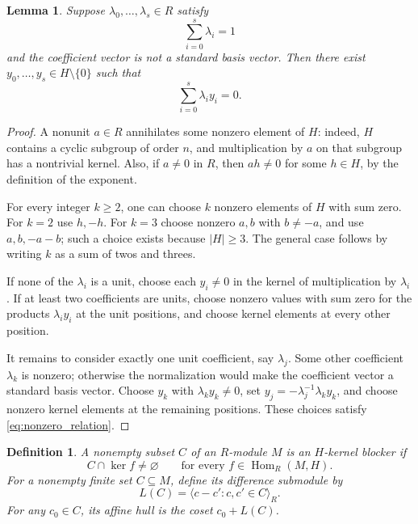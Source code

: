 \documentclass[10pt,a4paper]{amsart}
\newtheorem{lemma}[theorem]{Lemma}
\newtheorem{definition}[theorem]{Definition}
\numberwithin{equation}{section}
\newcommand{\Hom}{\operatorname{Hom}}
\renewcommand{\geq}{\geqslant}
\begin{document}
\begin{lemma}\label{lem:nonzero}
Suppose $\lambda_0,\ldots,\lambda_s\in R$ satisfy
\[
 \sum_{i=0}^{s}\lambda_i=1
\]
and the coefficient vector is not a standard basis vector. Then there exist $y_0,\ldots,y_s\in H\setminus\{0\}$ such that
\begin{equation}\label{eq:nonzero_relation}
 \sum_{i=0}^{s}\lambda_i y_i=0.
\end{equation}
\end{lemma}
\begin{proof}
A nonunit $a\in R$ annihilates some nonzero element of $H$: indeed, $H$ contains a cyclic subgroup of order $n$, and multiplication by $a$ on that subgroup has a nontrivial kernel. Also, if $a\ne 0$ in $R$, then $ah\ne 0$ for some $h\in H$, by the definition of the exponent.

For every integer $k\geq 2$, one can choose $k$ nonzero elements of $H$ with sum zero. For $k=2$ use $h,-h$. For $k=3$ choose nonzero $a,b$ with $b\ne-a$, and use $a,b,-a-b$; such a choice exists because $|H|\geq 3$. The general case follows by writing $k$ as a sum of twos and threes.

If none of the $\lambda_i$ is a unit, choose each $y_i\ne 0$ in the kernel of multiplication by $\lambda_i$. If at least two coefficients are units, choose nonzero values with sum zero for the products $\lambda_i y_i$ at the unit positions, and choose kernel elements at every other position.

It remains to consider exactly one unit coefficient, say $\lambda_j$. Some other coefficient $\lambda_k$ is nonzero; otherwise the normalization would make the coefficient vector a standard basis vector. Choose $y_k$ with $\lambda_k y_k\ne 0$, set $y_j=-\lambda_j^{-1}\lambda_k y_k$, and choose nonzero kernel elements at the remaining positions. These choices satisfy \eqref{eq:nonzero_relation}.
\end{proof}

\begin{definition}
A nonempty subset $C$ of an $R$-module $M$ is an \emph{$H$-kernel blocker} if
\[
 C\cap\ker f\ne\varnothing\qquad\text{for every }f\in\Hom_R(M,H).
\]
For a nonempty finite set $C\subseteq M$, define its \emph{difference submodule} by
\[
 L(C)=\langle c-c':c,c'\in C\rangle_R.
\]
For any $c_0\in C$, its affine hull is the coset $c_0+L(C)$.
\end{definition}
\end{document}
